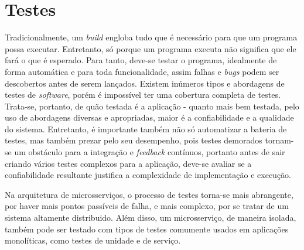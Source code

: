 

\section{Testes}

Tradicionalmente, um \emph{build} engloba tudo que é necessário para que um programa possa executar. Entretanto, só porque um programa executa não significa que ele fará o que é esperado. Para tanto, deve-se testar o programa, idealmente de forma automática e para toda funcionalidade, assim falhas e \emph{bugs} podem ser descobertos antes de serem lançados. Existem inúmeros tipos e abordagens de testes de \emph{software}, porém é impossível ter uma cobertura completa de testes. Trata-se, portanto, de quão testada é a aplicação - quanto mais bem testada, pelo uso de abordagens diversas e apropriadas, maior é a confiabilidade e a qualidade do sistema. Entretanto, é importante também não só automatizar a bateria de testes, mas também prezar pelo seu desempenho, pois testes demorados tornam-se um obstáculo para a integração e \emph{feedback} contínuos, portanto antes de sair criando vários testes complexos para a aplicação, deve-se avaliar se a confiabilidade resultante justifica a complexidade de implementação e execução. \cite{martin-fowler-continuous-integration,livro-building-microservices}


Na arquitetura de microsserviços, o processo de testes torna-se mais abrangente, por haver mais pontos passíveis de falha, e mais complexo, por se tratar de um sistema altamente distribuido. Além disso, um microsserviço, de maneira isolada, também pode ser testado com tipos de testes comumente usados em aplicações monolíticas, como testes de unidade e de serviço.

